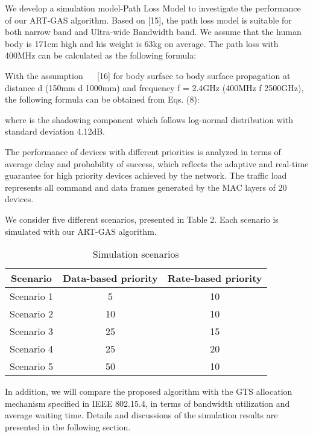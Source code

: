 \documentclass[letterpaper]{sig-alternate-10pt}
\begin{document}
We develop a simulation model-Path Loss Model to investigate the performance of our ART-GAS algorithm. Based on [15], the path loss model is suitable for both narrow band and Ultra-wide Bandwidth band. We assume that the human body is 171cm high and his weight is 63kg on average. The path loss with 400MHz can be calculated as the following formula:



With the assumption ~~ [16] for body surface to body surface propagation at distance d (150mm  d  1000mm) and frequency f = 2.4GHz (400MHz  f  2500GHz), the following formula can be obtained from Eqs. (8):



where  is the shadowing component which follows log-normal distribution with standard deviation 4.12dB.

The performance of devices with different priorities is analyzed in terms of average delay and probability of success, which reflects the adaptive and real-time guarantee for high priority devices achieved by the network. The traffic load represents all command and data frames generated by the MAC layers of 20 devices.

We consider five different scenarios, presented in Table 2. Each scenario is simulated with our ART-GAS algorithm.


\begin{table}[!t]\renewcommand{\captionfont}{\bfseries}
\setlength{\abovecaptionskip}{0pt}
\setlength{\belowcaptionskip}{5pt}
\centering
\caption{Simulation scenarios} \begin{tabular}{|c|c|c|}\hline Scenario&Data-based priority&Rate-based priority\\
\hline
Scenario 1&5&10\\
\cline{1-3}
Scenario 2&10&10\\
\cline{1-3}
Scenario 3&25&15\\
\cline{1-3}
Scenario 4&25&20\\
\cline{1-3}
Scenario 5&50&10\\
\hline
\end{tabular}
\end{table}

In addition, we will compare the proposed algorithm with the GTS allocation mechanism specified in IEEE 802.15.4, in terms of bandwidth utilization and average waiting time. Details and discussions of the simulation results are presented in the following section.
\end{document}
